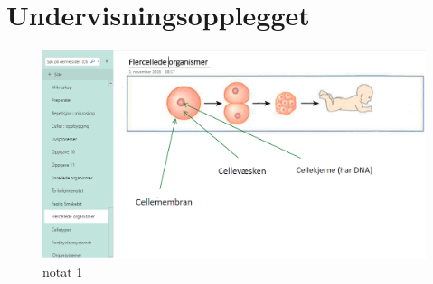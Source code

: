 \documentclass[main.tex]{subfiles}
\begin{document}
\section*{Undervisningsopplegget}
\label{sec:1}



\begin{figure}[h!]
\includegraphics[scale = 0.6]{../figures/onenote_flercellet.png}
\caption{notat 1}
\label{fig:notat1}
\end{figure}
\end{document}
